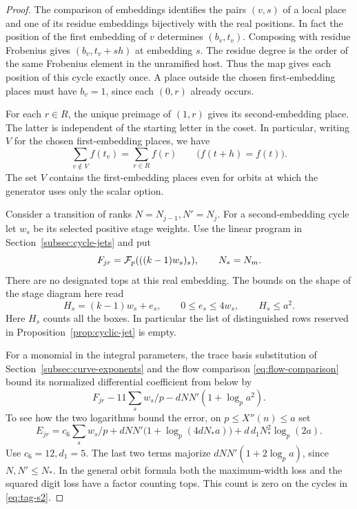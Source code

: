 \begin{proof}
The comparison of embeddings identifies the pairs \((v,s)\) of
a local place and one of its residue embeddings bijectively with
the real positions. In fact the position of the first embedding
of \(v\) determines \((b_v,t_v)\). Composing with residue
Frobenius gives \((b_v,t_v+s h)\) at embedding \(s\).
The residue degree is the order of the same Frobenius element in
the unramified host. Thus the map gives each position of this
cycle exactly once. A place outside the chosen first-embedding
places must have \(b_v=1\), since each \((0,r)\) already occurs.

For each \(r\in R\), the unique preimage of \((1,r)\) gives its
second-embedding place. The latter is independent of the starting
letter in the coset. In particular, writing \(V\) for the chosen
first-embedding places, we have
\[
  \sum_{v\notin V} f(t_v)=\sum_{r\in R}f(r)
  \qquad\bigl(f(t+h)=f(t)\bigr).
  \tag{S1}\label{eq:tag-s1}
\]
The set \(V\) contains the first-embedding places even for
orbits at which the generator uses only the scalar option.

Consider a transition of ranks \(N=N_{j-1},N'=N_j\).
For a second-embedding cycle let \(w_s\) be its selected positive
stage weights. Use the linear program in
Section~\ref{subsec:cycle-jets} and put
\[
 F_{jr}={\cal F}_p(((k-1)w_s)_s),\qquad N_* = N_m .
\]
There are no designated tops at this real embedding. The bounds
on the shape of the stage diagram here read
\[
 H_s=(k-1)w_s+e_s,\qquad 0\le e_s\le4w_s,\qquad H_s\le a^2 .
\]
Here \(H_s\) counts all the boxes. In particular the list of
distinguished rows reserved in Proposition~\ref{prop:cyclic-jet}
is empty.

For a monomial in the integral parameters, the trace
basis substitution of Section~\ref{subsec:curve-exponents} and the
flow comparison \eqref{eq:flow-comparison} bound its normalized
differential coefficient from below by
\[
 F_{jr}-11\sum_s w_s/p-dNN'(1+\log_p a^2).
\]
To see how the two logarithms bound the error, on \(p\le X''(n)\le a\) set
\[
 E_{jr}= c_6\sum_s w_s/p
 +dNN'\bigl(1+\log_p(4dN_*a)\bigr)
 +d\,d_1 N_*^2\log_p(2a).
 \tag{S2}\label{eq:tag-s2}
\]
Use \(c_6=12,d_1=5\). The last two terms majorize
\(dNN'(1+2\log_p a)\), since \(N,N'\le N_*\).
In the general orbit formula both the maximum-width loss and
the squared digit loss have a factor counting tops. This count
is zero on the cycles in \eqref{eq:tag-s2}.


\end{proof}
